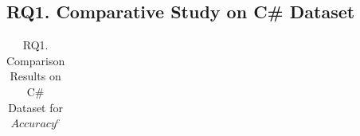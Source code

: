 \subsection{RQ1. Comparative Study on C\# Dataset}
\label{rq1:sec}

\begin{table}[t]
	\caption{RQ1. Comparison Results on C\# Dataset for $Accuracy^c$}
	\vspace{-0.1in}
	\begin{center}
		\scriptsize
		\tabcolsep 4pt
		\renewcommand{\arraystretch}{1} \begin{tabular}{p{0.2cm}<{\centering}|p{0.25cm}<{\centering}p{0.25cm}<{\centering}p{0.25cm}<{\centering}|p{0.25cm}<{\centering}p{0.25cm}<{\centering}p{0.25cm}<{\centering}|p{0.25cm}<{\centering}p{0.25cm}<{\centering}p{0.25cm}<{\centering}|p{0.25cm}<{\centering}p{0.25cm}<{\centering}p{0.25cm}<{\centering}|p{0.25cm}<{\centering}p{0.25cm}<{\centering}p{0.25cm}<{\centering}}
			

\end{tabular}
\end{center}
\end{table}
